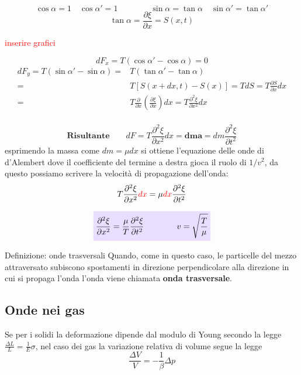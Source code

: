 \documentclass[x11names]{report}
\newcommand{\viola}[1]{\colorbox{yred}{$\displaystyle #1$}}
\begin{document}
	\[ 
	\cos{\alpha} = 1 \quad \cos{\alpha'} = 1 \qquad \qquad \sin{\alpha} = \tan{\alpha} \quad \sin{\alpha'} = \tan{\alpha'}
	\]
	\[ 
	\boxed{\tan\alpha = \frac{\partial \xi}{\partial x} = S(x,t)}
	\]
	
	\begin{center}
		\textcolor{red}{inserire grafici}
	\end{center}
	
	
	\[ 
	dF_x = T(\cos\alpha' - \cos\alpha ) = 0 
	\]
	\begin{align*}
		dF_y = T(\sin\alpha' - \sin\alpha ) =& T(\tan\alpha' - \tan\alpha )\\
		=& T\left[S(x+dx,t) - S(x)\right] = TdS = T\frac{\partial S}{\partial x}dx \\
		=& T\frac{\partial}{\partial x}\left(\frac{\partial \xi}{\partial x}\right)dx =  T\frac{\partial^2 \xi}{\partial x^2}dx\\
	\end{align*}
	
	\[ 
	\textbf{Risultante} \qquad	dF =  T\frac{\partial^2 \xi}{\partial x^2}dx  \mathbf{= dm a} = dm \frac{\partial^2 \xi}{\partial t^2} 
	\]
	esprimendo la massa come \(dm = \mu dx\) si ottiene l'equazione delle onde di d'Alembert dove il coefficiente del termine a destra gioca il ruolo di \(1/v^2\), da questo possiamo scrivere la velocità di propagazione dell'onda:
	\[ 
	T\frac{\partial^2\xi}{\partial x^2}\textcolor{red}{dx} = \mu \textcolor{red}{dx} \frac{\partial^2 \xi}{\partial t^2}
	\]

	\begin{equation}\label{corda}
		\viola{	\frac{\partial^2\xi}{\partial x^2} = \frac{\mu}{T} \frac{\partial^2 \xi}{\partial t^2} \qquad \qquad v = \sqrt{\frac{T}{\mu}}}
	\end{equation}
	
	\begin{center}
		\colorbox{yblue}{\begin{minipage}{5.75in}
				\begin{blues}{Definizione: onde trasversali}
					Quando, come in questo caso, le particelle del mezzo attraversato subiscono spostamenti in direzione perpendicolare alla direzione in cui si propaga l'onda l'onda viene chiamata \textbf{onda trasversale}.
				\end{blues}
		\end{minipage}}
	\end{center}
	
\newpage
\subsection{Onde nei gas}
	Se per i solidi la deformazione dipende dal modulo di Young secondo la legge \(\frac{\Delta L}{L} = \frac{1}{E}\sigma\), nel caso dei gas la variazione relativa di volume segue la legge
	\[ 
	\frac{\Delta V}{V} = -\frac{1}{\beta} \Delta p
	\] \\
	
\end{document}
